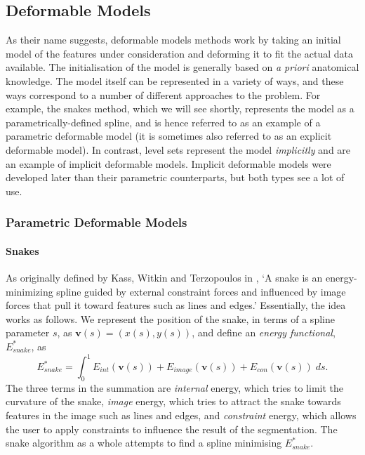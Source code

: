 
\subsection{Deformable Models}

As their name suggests, deformable models methods work by taking an initial model of the features under consideration and deforming it to fit the actual data available. The initialisation of the model is generally based on \emph{a priori} anatomical knowledge. The model itself can be represented in a variety of ways, and these ways correspond to a number of different approaches to the problem. For example, the snakes method, which we will see shortly, represents the model as a parametrically-defined spline, and is hence referred to as an example of a parametric deformable model (it is sometimes also referred to as an explicit deformable model). In contrast, level sets represent the model \emph{implicitly} and are an example of implicit deformable models. Implicit deformable models were developed later than their parametric counterparts, but both types see a lot of use.

\subsubsection{Parametric Deformable Models}

\paragraph{Snakes}


As originally defined by Kass, Witkin and Terzopoulos in \cite{kass88}, `A snake is an energy-minimizing spline guided by external constraint forces and influenced by image forces that pull it toward features such as lines and edges.' Essentially, the idea works as follows. We represent the position of the snake, in terms of a spline parameter $s$, as $\mathbf{v}(s) = (x(s),y(s))$, and define an \emph{energy functional}, $E_{snake}^*$, as
%
\[
E_{snake}^* = \int_0^1 E_{int}(\mathbf{v}(s)) + E_{image}(\mathbf{v}(s)) + E_{con}(\mathbf{v}(s)) \; ds.
\]
%
The three terms in the summation are \emph{internal} energy, which tries to limit the curvature of the snake, \emph{image} energy, which tries to attract the snake towards features in the image such as lines and edges, and \emph{constraint} energy, which allows the user to apply constraints to influence the result of the segmentation. The snake algorithm as a whole attempts to find a spline minimising $E_{snake}^*$.

